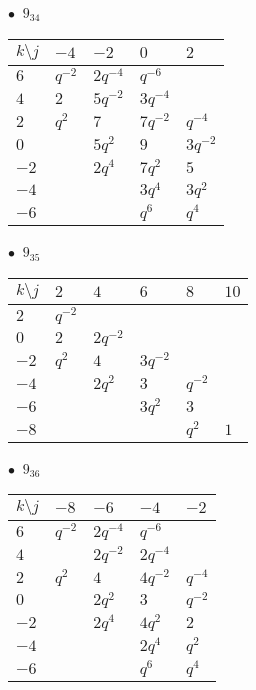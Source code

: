 %
\begin{minipage}{\linewidth}
$\bullet\ $ $9_{34}$ \vspace{0.5em} \\
\begin{tabular}{l|llll}
$k \setminus j$ & $-4$ & $-2$ & $0$ & $2$ \\
\hline
$6$ & $q^{-2}$ & $2q^{-4}$ & $q^{-6}$ &  \\
$4$ & $2$ & $5q^{-2}$ & $3q^{-4}$ &  \\
$2$ & $q^{2}$ & $7$ & $7q^{-2}$ & $q^{-4}$ \\
$0$ &  & $5q^{2}$ & $9$ & $3q^{-2}$ \\
$-2$ &  & $2q^{4}$ & $7q^{2}$ & $5$ \\
$-4$ &  &  & $3q^{4}$ & $3q^{2}$ \\
$-6$ &  &  & $q^{6}$ & $q^{4}$ \\
\end{tabular}
\vspace{2em}
\end{minipage}
%
\begin{minipage}{\linewidth}
$\bullet\ $ $9_{35}$ \vspace{0.5em} \\
\begin{tabular}{l|lllll}
$k \setminus j$ & $2$ & $4$ & $6$ & $8$ & $10$ \\
\hline
$2$ & $q^{-2}$ &  &  &  &  \\
$0$ & $2$ & $2q^{-2}$ &  &  &  \\
$-2$ & $q^{2}$ & $4$ & $3q^{-2}$ &  &  \\
$-4$ &  & $2q^{2}$ & $3$ & $q^{-2}$ &  \\
$-6$ &  &  & $3q^{2}$ & $3$ &  \\
$-8$ &  &  &  & $q^{2}$ & $1$ \\
\end{tabular}
\vspace{2em}
\end{minipage}
%
\begin{minipage}{\linewidth}
$\bullet\ $ $9_{36}$ \vspace{0.5em} \\
\begin{tabular}{l|llll}
$k \setminus j$ & $-8$ & $-6$ & $-4$ & $-2$ \\
\hline
$6$ & $q^{-2}$ & $2q^{-4}$ & $q^{-6}$ &  \\
$4$ &  & $2q^{-2}$ & $2q^{-4}$ &  \\
$2$ & $q^{2}$ & $4$ & $4q^{-2}$ & $q^{-4}$ \\
$0$ &  & $2q^{2}$ & $3$ & $q^{-2}$ \\
$-2$ &  & $2q^{4}$ & $4q^{2}$ & $2$ \\
$-4$ &  &  & $2q^{4}$ & $q^{2}$ \\
$-6$ &  &  & $q^{6}$ & $q^{4}$ \\
\end{tabular}
\vspace{2em}
\end{minipage}
